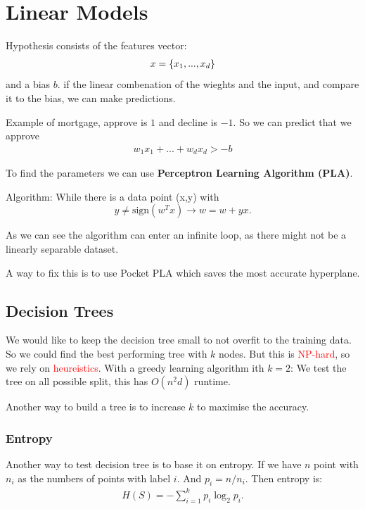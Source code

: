 \documentclass[a4paper,oneside,article]{memoir}
\begin{document}
\chapter{Linear Models}
Hypothesis consists of the features vector: 
\begin{align*}
    x = \br[4]{x_1,..., x_d}
\end{align*}
and a bias $b$. 
if the linear combenation of the wieghts and the input, 
and compare it to the bias, we can make predictions. 

Example of mortgage, approve is $1$ and decline is $-1$. 
So we can predict that we approve
\begin{align*}
    w_1x_1+...+w_dx_d > -b 
\end{align*}

To find the parameters we can use \textbf{Perceptron Learning Algorithm (PLA)}.

Algorithm: 
While there is a data point (x,y) with \[y \neq \text{sign}(w^Tx) \rightarrow w = w +yx.\]

As we can see the algorithm can enter an infinite loop, 
as there might not be a linearly separable dataset. 

A way to fix this is to use Pocket PLA which saves the most accurate hyperplane. 

\section{Decision Trees}
We would like to keep the decision tree small to not overfit to the training data. 
So we could find the best performing tree with $k$ nodes. 
But this is \textcolor{red}{NP-hard}, so we rely on \textcolor{red}{heureistics}. 
With a greedy learning algorithm ith $k=2$: 
We test the tree on all possible split, this has $O(n^2d)$ runtime. 

Another way to build a tree is to increase $k$ to maximise the accuracy. 

\subsection{Entropy}
Another way to test decision tree is to base it on entropy. 
If we have $n$ point with $n_i$ as the numbers of points with label $i$. 
And $p_i = n/n_i$. Then entropy is: 
\begin{align*}
    H(S) = -\sum_{i=1}^{k} p_i\log_2 p_i. 
\end{align*}
\end{document}
